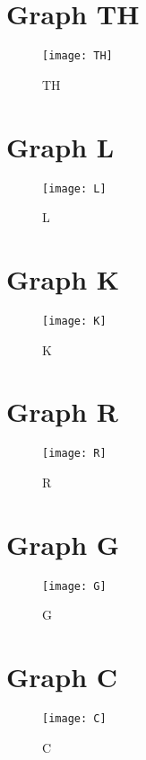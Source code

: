 \documentclass[a4paper,10pt]{article}
\begin{document}
\section{Graph TH}

\begin{figure}[h!]
  \centering
    \texttt{[image: TH]}
  \caption{TH}
\end{figure}


\section{Graph L}

\begin{figure}[h!]
  \centering
    \texttt{[image: L]}
  \caption{L}
\end{figure}

\section{Graph K}

\begin{figure}[h!]
  \centering
    \texttt{[image: K]}
  \caption{K}
\end{figure}

\section{Graph R}

\begin{figure}[h!]
  \centering
    \texttt{[image: R]}
  \caption{R}
\end{figure}

\section{Graph G}

\begin{figure}[h!]
  \centering
    \texttt{[image: G]}
  \caption{G}
\end{figure}

\section{Graph C}

\begin{figure}[h!]
  \centering
    \texttt{[image: C]}
  \caption{C}
\end{figure}
\end{document}

